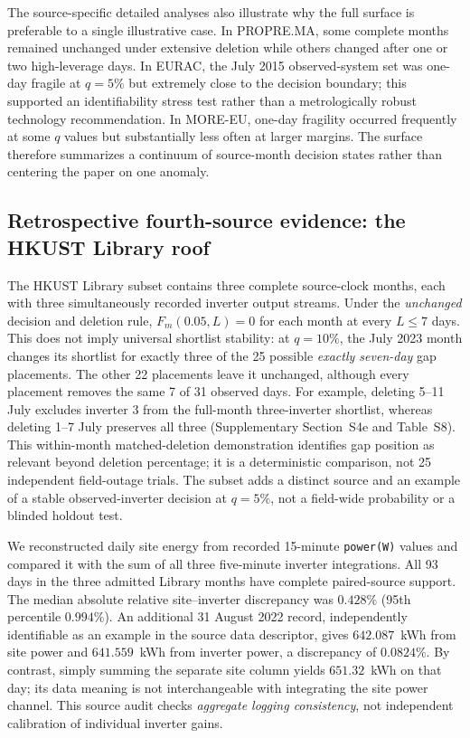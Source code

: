 \documentclass[preprint,12pt]{elsarticle}
\begin{document}
The source-specific detailed analyses also illustrate why the full surface is preferable to a single illustrative case. In PROPRE.MA, some complete months remained unchanged under extensive deletion while others changed after one or two high-leverage days. In EURAC, the July 2015 observed-system set was one-day fragile at $q=5\%$ but extremely close to the decision boundary; this supported an identifiability stress test rather than a metrologically robust technology recommendation. In MORE-EU, one-day fragility occurred frequently at some $q$ values but substantially less often at larger margins. The surface therefore summarizes a continuum of source-month decision states rather than centering the paper on one anomaly.

\subsection{Retrospective fourth-source evidence: the HKUST Library roof}
The HKUST Library subset contains three complete source-clock months, each with three simultaneously recorded inverter output streams. Under the \emph{unchanged} decision and deletion rule, $F_m(0.05,L)=0$ for each month at every $L\leq7$ days. This does not imply universal shortlist stability: at $q=10\%$, the July 2023 month changes its shortlist for exactly three of the 25 possible \emph{exactly seven-day} gap placements. The other 22 placements leave it unchanged, although every placement removes the same 7 of 31 observed days. For example, deleting 5--11 July excludes inverter 3 from the full-month three-inverter shortlist, whereas deleting 1--7 July preserves all three (Supplementary Section~S4e and Table~S8). This within-month matched-deletion demonstration identifies gap position as relevant beyond deletion percentage; it is a deterministic comparison, not 25 independent field-outage trials. The subset adds a distinct source and an example of a stable observed-inverter decision at $q=5\%$, not a field-wide probability or a blinded holdout test.

We reconstructed daily site energy from recorded 15-minute \texttt{power(W)} values and compared it with the sum of all three five-minute inverter \texttt{} integrations. All 93 days in the three admitted Library months have complete paired-source support. The median absolute relative site--inverter discrepancy was $0.428\%$ (95th percentile $0.994\%$). An additional 31 August 2022 record, independently identifiable as an example in the source data descriptor, gives $642.087$~kWh from site power and $641.559$~kWh from inverter power, a discrepancy of $0.0824\%$. By contrast, simply summing the separate site \texttt{} column yields $651.32$~kWh on that day; its data meaning is not interchangeable with integrating the site power channel. This source audit checks \emph{aggregate logging consistency}, not independent calibration of individual inverter gains.
\end{document}
